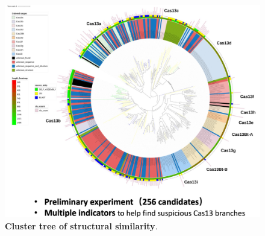 \documentclass[12pt]{article}
\begin{document}
\begin{figure}[htb]
	\centering
	\includegraphics[width=1\textwidth]{figs/Cas13_structure_tree.jpg} 
	\caption{\textbf{Cluster tree of structural similarity}.}
	\label{fig:Cas13_structure_tree}
\end{figure}



\clearpage %

%

\end{document}
